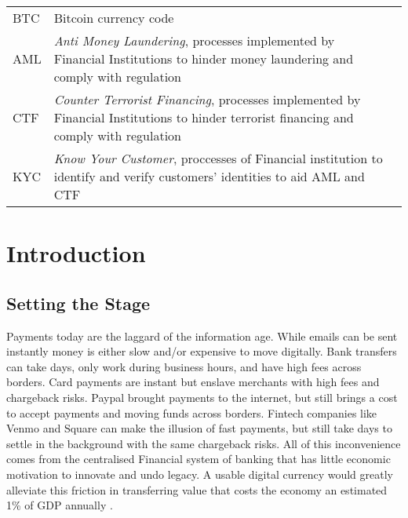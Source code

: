 \documentclass[12pt]{article} %
\begin{document}
\begin{tabular}{p{3 cm}ll} %
BTC & Bitcoin currency code\\
AML & \textit{Anti Money Laundering}, processes implemented by Financial Institutions to hinder money laundering and comply with regulation\\
CTF & \textit{Counter Terrorist Financing}, processes implemented by Financial Institutions to hinder terrorist financing and comply with regulation\\
KYC & \textit{Know Your Customer}, proccesses of Financial institution to identify and verify customers' identities to aid AML and CTF
\end{tabular}


\pagebreak

\tableofcontents
\newpage

\listoffigures
\pagebreak

\listoftables
\pagebreak

\section{Introduction}
\label{Introduction}

\subsection{Setting the Stage}
Payments today are the laggard of the information age. While emails can be sent instantly money is either slow and/or expensive to move digitally. Bank transfers can take days, only work during business hours, and have high fees across borders. Card payments are instant but enslave merchants with high fees and chargeback risks. Paypal brought payments to the internet, but still brings a cost to accept payments and moving funds across borders. Fintech companies like Venmo and Square can make the illusion of fast payments, but still take days to settle in the background with the same chargeback risks. All of this inconvenience comes from the centralised Financial system of banking that has little economic motivation to innovate and undo legacy. A usable digital currency would greatly alleviate this friction in transferring value that costs the economy an estimated 1\% of GDP annually \cite{kaarmann2013cost}.
\end{document}
